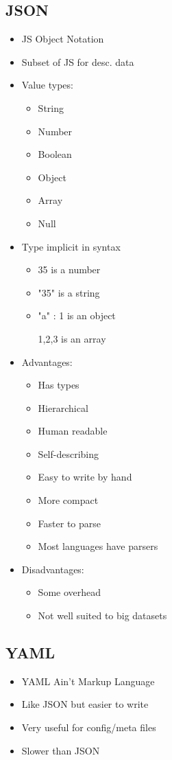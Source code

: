\documentclass[a4paper]{article}
\begin{document}
\subsection{JSON}
\begin{itemize}
	\item JS Object Notation
	\item Subset of JS for desc. data
	\item Value types:
	\begin{itemize}
		\item String
		\item Number
		\item Boolean
		\item Object
		\item Array
		\item Null
	\end{itemize}
	\item Type implicit in syntax
	\begin{itemize}
		\item 35 is a number
		\item "35" is a string
		\item {"a" : 1} is an object
		\item [1,2,3] is an array
	\end{itemize}
	\item Advantages:
	\begin{itemize}
		\item Has types
		\item Hierarchical
		\item Human readable
		\item Self-describing
		\item Easy to write by hand
		\item More compact
		\item Faster to parse
		\item Most languages have parsers
	\end{itemize}
	\item Disadvantages:
	\begin{itemize}
		\item Some overhead
		\item Not well suited to big datasets
	\end{itemize}
\end{itemize}
\subsection{YAML}
\begin{itemize}
	\item YAML Ain't Markup Language
	\item Like JSON but easier to write
	\item Very useful for config/meta files
	\item Slower than JSON
\end{itemize}
\end{document}
